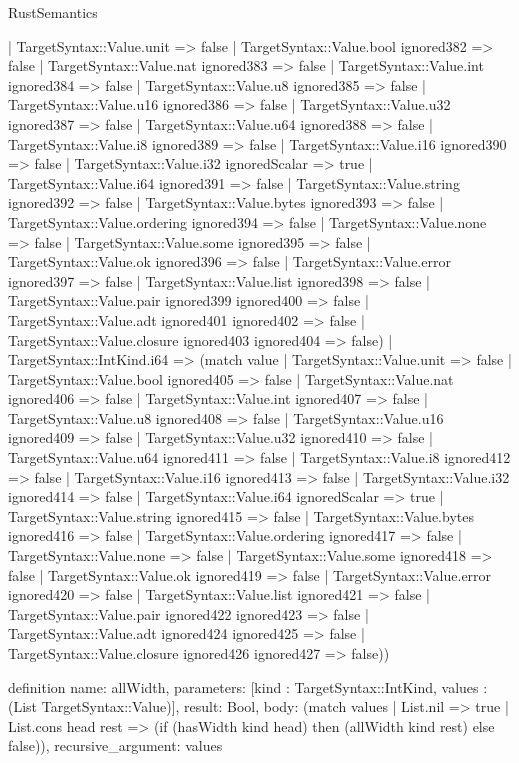 \begin{lexlean}{RustSemantics}
\begin{semanticmodule}
{      | TargetSyntax::Value.unit => false
      | TargetSyntax::Value.bool ignored382 => false
      | TargetSyntax::Value.nat ignored383 => false
      | TargetSyntax::Value.int ignored384 => false
      | TargetSyntax::Value.u8 ignored385 => false
      | TargetSyntax::Value.u16 ignored386 => false
      | TargetSyntax::Value.u32 ignored387 => false
      | TargetSyntax::Value.u64 ignored388 => false
      | TargetSyntax::Value.i8 ignored389 => false
      | TargetSyntax::Value.i16 ignored390 => false
      | TargetSyntax::Value.i32 ignoredScalar => true
      | TargetSyntax::Value.i64 ignored391 => false
      | TargetSyntax::Value.string ignored392 => false
      | TargetSyntax::Value.bytes ignored393 => false
      | TargetSyntax::Value.ordering ignored394 => false
      | TargetSyntax::Value.none => false
      | TargetSyntax::Value.some ignored395 => false
      | TargetSyntax::Value.ok ignored396 => false
      | TargetSyntax::Value.error ignored397 => false
      | TargetSyntax::Value.list ignored398 => false
      | TargetSyntax::Value.pair ignored399 ignored400 => false
      | TargetSyntax::Value.adt ignored401 ignored402 => false
      | TargetSyntax::Value.closure ignored403 ignored404 => false)
    | TargetSyntax::IntKind.i64 => (match value
      | TargetSyntax::Value.unit => false
      | TargetSyntax::Value.bool ignored405 => false
      | TargetSyntax::Value.nat ignored406 => false
      | TargetSyntax::Value.int ignored407 => false
      | TargetSyntax::Value.u8 ignored408 => false
      | TargetSyntax::Value.u16 ignored409 => false
      | TargetSyntax::Value.u32 ignored410 => false
      | TargetSyntax::Value.u64 ignored411 => false
      | TargetSyntax::Value.i8 ignored412 => false
      | TargetSyntax::Value.i16 ignored413 => false
      | TargetSyntax::Value.i32 ignored414 => false
      | TargetSyntax::Value.i64 ignoredScalar => true
      | TargetSyntax::Value.string ignored415 => false
      | TargetSyntax::Value.bytes ignored416 => false
      | TargetSyntax::Value.ordering ignored417 => false
      | TargetSyntax::Value.none => false
      | TargetSyntax::Value.some ignored418 => false
      | TargetSyntax::Value.ok ignored419 => false
      | TargetSyntax::Value.error ignored420 => false
      | TargetSyntax::Value.list ignored421 => false
      | TargetSyntax::Value.pair ignored422 ignored423 => false
      | TargetSyntax::Value.adt ignored424 ignored425 => false
      | TargetSyntax::Value.closure ignored426 ignored427 => false))
}

definition{
  name: allWidth,
  parameters: [kind : TargetSyntax::IntKind, values : (List TargetSyntax::Value)],
  result: Bool,
  body: (match values
    | List.nil => true
    | List.cons head rest => (if (hasWidth kind head) then (allWidth kind rest) else false)),
  recursive_argument: values
}


\end{semanticmodule}
\end{lexlean}
